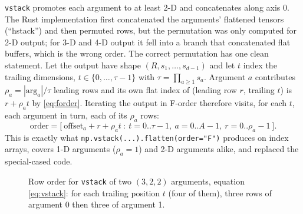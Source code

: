 \documentclass[11pt,a4paper]{article}
\newcommand{\code}[1]{\texttt{#1}}
\begin{document}
\code{vstack} promotes each argument to at least 2-D and concatenates along axis 0. The Rust
implementation first concatenated the arguments' flattened tensors (``hstack'') and then permuted rows,
but the permutation was only computed for 2-D output; for 3-D and 4-D output it fell into a branch that
concatenated flat buffers, which is the wrong order. The correct permutation has one clean statement.
Let the output have shape $(R, s_1, \dots, s_{d-1})$ and let $t$ index the trailing dimensions,
$t \in \{0,\dots,\tau-1\}$ with $\tau = \prod_{a\ge1} s_a$. Argument $a$ contributes $\rho_a = |\text{arg}_a|/\tau$
leading rows and its own flat index of (leading row $r$, trailing $t$) is $r + \rho_a t$ by
\eqref{eq:forder}. Iterating the output in F-order therefore visits, for each $t$, each argument in
turn, each of its $\rho_a$ rows:
\begin{equation}
  \label{eq:vstack}
  \text{order} = \big[\ \text{offset}_a + r + \rho_a t \ :\ t = 0..\tau{-}1,\ a = 0..A{-}1,\ r = 0..\rho_a{-}1\ \big].
\end{equation}
This is exactly what \code{np.vstack(...).flatten(order="F")} produces on index arrays, covers
1-D arguments ($\rho_a=1$) and 2-D arguments alike, and replaced the special-cased code.

\begin{figure}[H]
\centering
{}
\caption{Row order for \code{vstack} of two $(3,2,2)$ arguments, equation \eqref{eq:vstack}: for each
trailing position $t$ (four of them), three rows of argument 0 then three of argument 1.}
\end{figure}
\end{document}
